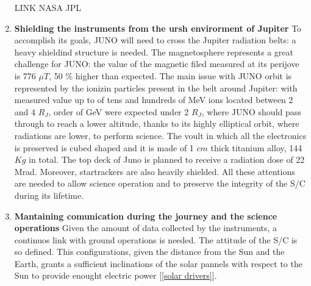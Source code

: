 \begin{enumerate}[leftmargin=1.5em]
    LINK NASA JPL 
    \item \textbf{Shielding the instruments from the ursh envirorment of Jupiter}
    \newline To accomplish its goals, JUNO will need to cross the Jupiter radiation belts: a heavy shieldind structure is needed.  The magnetosphere represents a great challenge for JUNO: the value of the magnetic filed measured at its perijove is 776 $\mu T$, 50 \% higher than expected. The main issue with JUNO orbit is represented by the ionizin particles present in the belt around Jupiter: with measured value up to of tens and hundreds of MeV ions located between 2 and 4 $R_{J}$, order of GeV were expected under 2 $R_{J}$, where JUNO should pass through to reach a lower altitude, thanks to its highly elliptical orbit, where radiations are lower, to perform science. The voult in which all the electronics is preserved is cubed shaped and it is made of 1 $cm$ thick titanium alloy, 144 $Kg$ in total. The top deck of Juno is planned to receive a radiation dose of 22 Mrad. Moreover, startrackers are also heavily shielded. All these attentions are needed to allow science operation and to preserve the integrity of the S/C during its lifetime. 
    \item \textbf{Mantaining comunication during the journey and the science operations}
    \newline Given the amount of data collected by the instruments, a continuos link with ground operations is needed. The attitude of the S/C is so defined. This configurations, given the distance from the Sun and the Earth, grants a sufficient inclinations of the solar pannels with respect to the Sun to provide enought electric power [\ref{solar drivers}].
\end{enumerate}  